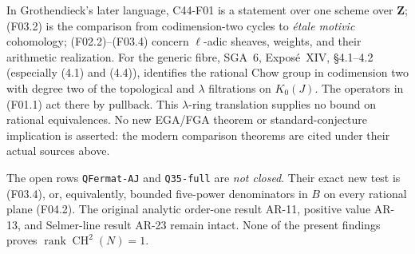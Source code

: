 In Grothendieck's later language, C44-F01 is a statement over
one scheme over $\mathbf Z$; (F03.2) is the comparison from
codimension-two cycles to \emph{\'etale motivic} cohomology;
(F02.2)--(F03.4) concern $\ell$-adic sheaves, weights, and their
arithmetic realization.  For the generic fibre, SGA~6,
Expos\'e~XIV, \S4.1--4.2 (especially (4.1) and (4.4)),
identifies the rational Chow group in codimension two with
degree two of the topological and $\lambda$ filtrations on
$K_0(J)$.  The operators in (F01.1) act there by pullback.
This $\lambda$-ring translation supplies no bound on rational
equivalences.  No new EGA/FGA theorem or standard-conjecture
implication is asserted: the modern comparison theorems are
cited under their actual sources above.

The open rows \texttt{QFermat-AJ} and \texttt{Q35-full} are
\emph{not closed}.  Their exact new test is (F03.4), or,
equivalently, bounded five-power denominators in $B$ on every
rational plane (F04.2).  The original analytic order-one result
AR-11, positive value AR-13, and Selmer-line result AR-23
remain intact.  None of the present findings proves
$\operatorname{rank}\operatorname{CH}^2(N)=1$.
